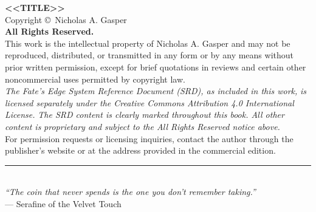 \newpage
\thispagestyle{empty}
\begin{center}
  \vspace*{2in}
  \textbf{<<TITLE>>}\\[0.2in]
  Copyright \copyright\ Nicholas A. Gasper\\[0.2in]
  \textbf{All Rights Reserved.}\\[0.1in]
  This work is the intellectual property of Nicholas A. Gasper and may not be reproduced,
  distributed, or transmitted in any form or by any means without prior written permission,
  except for brief quotations in reviews and certain other noncommercial uses permitted
  by copyright law.\\[0.2in]
  \textit{The Fate's Edge System Reference Document (SRD), as included in this work,}
  \textit{is licensed separately under the Creative Commons Attribution 4.0 International License.}
  \textit{The SRD content is clearly marked throughout this book. All other content is}
  \textit{proprietary and subject to the All Rights Reserved notice above.}\\[0.2in]
  For permission requests or licensing inquiries, contact the author through the
  publisher's website or at the address provided in the commercial edition.\\[0.2in]
  \rule{0.5\textwidth}{0.4pt}\\[0.2in]
  \textit{``The coin that never spends is the one you don't remember taking.''}\\[0.1in]
  --- Serafine of the Velvet Touch
\end{center}
\newpage
